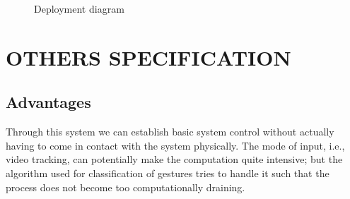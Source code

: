 \documentclass[oneside,a4paper,12pt]{report}
\begin{document}
        \begin{center}
        	\begin{figure}[!hp]
        		\centering
        	  \caption{Deployment diagram}
        	  \label{fig:Deployment diagram}
        	\end{figure}
        \end{center}
        
    
































\chapter{OTHERS SPECIFICATION}

    \section{Advantages}
    Through this system we can establish basic system control without actually having to
come in contact with the system physically.
    The mode of input, i.e., video tracking, can potentially make the computation quite
intensive; but the algorithm used for classification of gestures tries to handle it such
that the process does not become too computationally draining.
\end{document}
